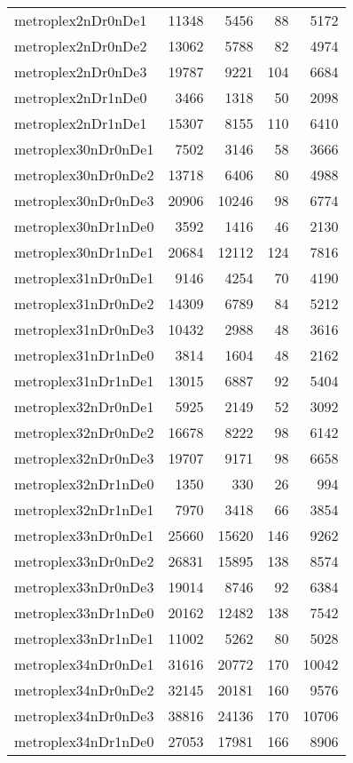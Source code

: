 \begin{longtable}{lrrrr}
metroplex2nDr0nDe1 & 11348 & 5456 & 88 & 5172 \\
metroplex2nDr0nDe2 & 13062 & 5788 & 82 & 4974 \\
metroplex2nDr0nDe3 & 19787 & 9221 & 104 & 6684 \\
metroplex2nDr1nDe0 & 3466 & 1318 & 50 & 2098 \\
metroplex2nDr1nDe1 & 15307 & 8155 & 110 & 6410 \\
metroplex30nDr0nDe1 & 7502 & 3146 & 58 & 3666 \\
metroplex30nDr0nDe2 & 13718 & 6406 & 80 & 4988 \\
metroplex30nDr0nDe3 & 20906 & 10246 & 98 & 6774 \\
metroplex30nDr1nDe0 & 3592 & 1416 & 46 & 2130 \\
metroplex30nDr1nDe1 & 20684 & 12112 & 124 & 7816 \\
metroplex31nDr0nDe1 & 9146 & 4254 & 70 & 4190 \\
metroplex31nDr0nDe2 & 14309 & 6789 & 84 & 5212 \\
metroplex31nDr0nDe3 & 10432 & 2988 & 48 & 3616 \\
metroplex31nDr1nDe0 & 3814 & 1604 & 48 & 2162 \\
metroplex31nDr1nDe1 & 13015 & 6887 & 92 & 5404 \\
metroplex32nDr0nDe1 & 5925 & 2149 & 52 & 3092 \\
metroplex32nDr0nDe2 & 16678 & 8222 & 98 & 6142 \\
metroplex32nDr0nDe3 & 19707 & 9171 & 98 & 6658 \\
metroplex32nDr1nDe0 & 1350 & 330 & 26 & 994 \\
metroplex32nDr1nDe1 & 7970 & 3418 & 66 & 3854 \\
metroplex33nDr0nDe1 & 25660 & 15620 & 146 & 9262 \\
metroplex33nDr0nDe2 & 26831 & 15895 & 138 & 8574 \\
metroplex33nDr0nDe3 & 19014 & 8746 & 92 & 6384 \\
metroplex33nDr1nDe0 & 20162 & 12482 & 138 & 7542 \\
metroplex33nDr1nDe1 & 11002 & 5262 & 80 & 5028 \\
metroplex34nDr0nDe1 & 31616 & 20772 & 170 & 10042 \\
metroplex34nDr0nDe2 & 32145 & 20181 & 160 & 9576 \\
metroplex34nDr0nDe3 & 38816 & 24136 & 170 & 10706 \\
metroplex34nDr1nDe0 & 27053 & 17981 & 166 & 8906 \\

\end{longtable}
